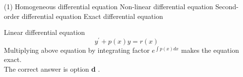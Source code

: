 \begin{enumerate}[label=\color{ocre}\textbf{\arabic*.}]
\begin{tasks}(1)
	\task[\textbf{a.}] Homogeneous differential equation 
	\task[\textbf{b.}]Non-linear differential equation
	\task[\textbf{c.}]Second-order differential equation 
	\task[\textbf{d.}]Exact differential equation
\end{tasks}
\begin{answer}
	 Linear differential equation
	$$
	y^{\prime}+p(x) y=r(x)
	$$
	Multiplying above equation by integrating factor $e^{\int p(x) d x}$ makes the equation exact.\\The correct answer is option \textbf{d} .
\end{answer}


\end{enumerate}


